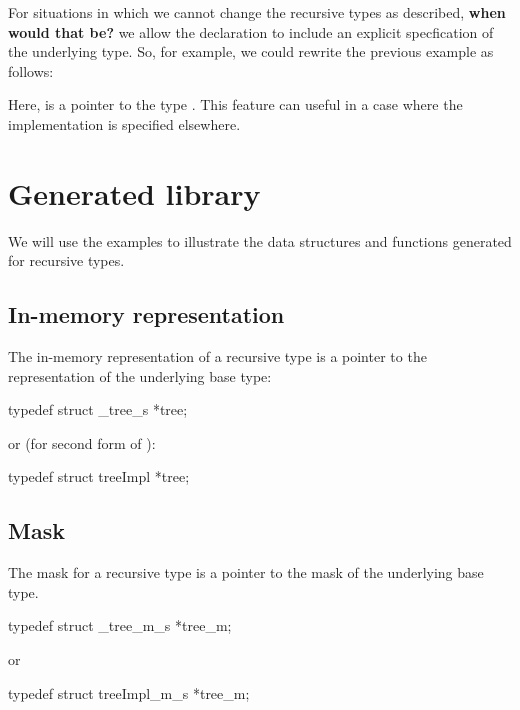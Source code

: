 For situations in which we cannot change the recursive types as
described, \textbf{when would that be?} we allow the 
declaration to include an explicit 
specfication of the underlying type. So, for example, we could rewrite
the previous example as follows:


Here,  is a pointer to the type . This feature
can useful in a case where the implementation is specified elsewhere.

\section{Generated library}
We will use the  examples to illustrate the data structures
and functions generated for recursive types.

\subsection{In-memory representation}
\label{sec:recur-rep}
The in-memory representation of a recursive type is a pointer to the
representation of the underlying base type:

\begin{code}
typedef struct _tree_s    *tree;
\end{code}
or (for second form of \Precur{}):
\begin{code}
typedef struct treeImpl    *tree;
\end{code}

\subsection{Mask}
\label{sec:recur-masks}
The mask for a recursive type is a pointer to the
mask of the underlying base type. 

\begin{code}
typedef struct _tree_m_s  *tree_m;
\end{code}
or
\begin{code}
typedef struct treeImpl_m_s  *tree_m;
\end{code}

